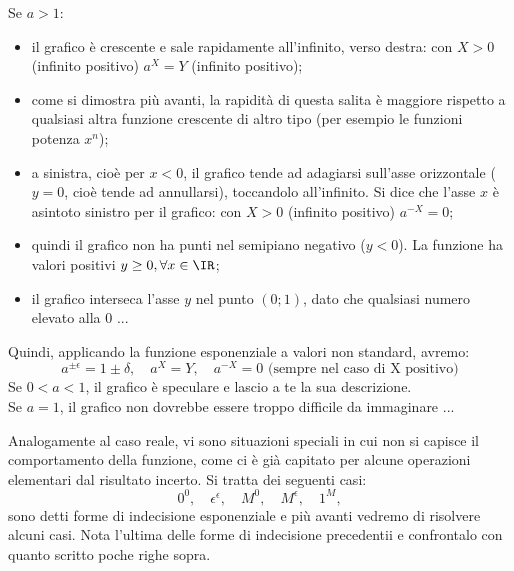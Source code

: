 Se $a>1$:
\begin{itemize} [noitemsep]
 \item 
il grafico è crescente e sale rapidamente all'infinito, verso destra: 
con $X>0$ (infinito positivo) $a^X=Y$ (infinito positivo);
 \item 
come si dimostra più avanti, la rapidità di questa salita è maggiore rispetto 
a qualsiasi altra funzione crescente di altro tipo (per esempio le funzioni 
potenza $x^n$);
 \item
a sinistra, cioè per $x<0$, il grafico tende ad adagiarsi sull'asse
orizzontale ($y=0$, cioè tende ad annullarsi), toccandolo all'infinito. Si
dice che l'asse $x$ è asintoto sinistro per il grafico: con $X>0$ (infinito
positivo) $a^{-X}=0$;
 \item
quindi il grafico non ha punti nel semipiano negativo ($y<0$). La funzione ha
valori positivi $y\ge 0, \forall x\in \IR$;
 \item
il grafico interseca l'asse $y$ nel punto $(0;1)$, dato che qualsiasi numero
elevato alla 0 ...
\end{itemize}
Quindi, applicando la funzione esponenziale a valori non standard, avremo: 
\[
 a^{\pm\epsilon}=1\pm\delta, \quad a^X=Y,\quad a^{-X}=0 \text{ (sempre nel caso di X positivo)}
\]
Se $0<a<1$, il grafico è speculare e lascio a te la sua descrizione.\\
Se $a=1$, il grafico non dovrebbe essere troppo difficile da immaginare ...



\begin{osservazione}
 Analogamente al caso reale, vi sono situazioni speciali in cui non si capisce il 
 comportamento della funzione, come ci è già capitato per alcune operazioni elementari
 dal risultato incerto. Si tratta dei seguenti casi:
 \[
  0^0,\quad \epsilon^\epsilon, \quad M^0, \quad M^\epsilon, \quad 1^M,
 \]
  sono detti forme di indecisione esponenziale e più avanti vedremo di risolvere
  alcuni casi.
  Nota l'ultima delle forme di indecisione precedentii e confrontalo con 
  quanto scritto poche righe sopra.
\end{osservazione}

